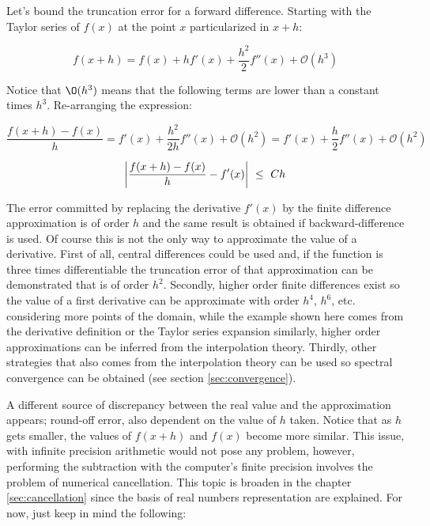 Let's bound the truncation error for a forward difference. Starting with the Taylor series of $f(x)$ at the point $x$ particularized in $x+h$:

$$
f(x+h) = f(x) + h f'(x) + \frac{h^2}{2} f''(x) + \mathcal{O}(h^3) 
$$

Notice that $\O(h^3)$ means that the following terms are lower than a constant times $h^3$. Re-arranging the expression:

$$
\frac{f(x+h) - f(x)}{h} = f'(x) + \frac{h^2}{2h} f''(x) + \mathcal{O}(h^2) = f'(x) + \frac{h}{2} f''(x) + \mathcal{O}(h^2) 
$$

$$
\abs{\frac{f(x+h) - f(x)}{h} - f'(x)}  \  \leq  \    C h  
$$

The error committed by replacing the derivative $f'(x)$ by the finite difference approximation is of order $h$ and the same result is obtained if backward-difference is used. Of course this is not the only way to approximate the value of a derivative. First of all, central differences could be used and, if the function is three times differentiable the truncation error of that approximation can be demonstrated that is of order $h^2$. Secondly, higher order finite differences exist so the value of a first derivative can be approximate with order $h^4$, $h^6$, etc. considering more points of the domain, while the example shown here comes from the derivative definition or the Taylor series expansion similarly, higher order approximations can be inferred from the interpolation theory. Thirdly, other strategies that also comes from the interpolation theory can be used so spectral convergence can be obtained (see section \ref{sec:convergence}). 

A different source of discrepancy between the real value and the approximation appears; round-off error, also dependent on the value of $h$ taken. Notice that as $h$ gets smaller, the values of $f(x+h)$ and $f(x)$ become more similar. This issue, with infinite precision arithmetic would not pose any problem, however, performing the subtraction with the computer's finite precision involves the problem of numerical cancellation. This topic is broaden in the chapter \ref{sec:cancellation} since the basis of real numbers representation are explained. For now, just keep in mind the following:

